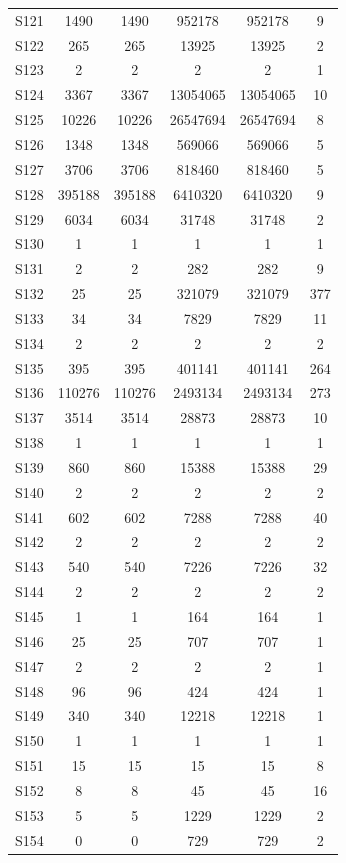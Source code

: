 {\begin{longtable}{l S[table-format=9.0] S[table-format=9.0] S[table-format=9.0] S[table-format=9.0] S[table-format=9.0]}
S121 & 1490 & 1490 & 952178 & 952178 & 9 \\
S122 & 265 & 265 & 13925 & 13925 & 2 \\
S123 & 2 & 2 & 2 & 2 & 1 \\
S124 & 3367 & 3367 & 13054065 & 13054065 & 10 \\
S125 & 10226 & 10226 & 26547694 & 26547694 & 8 \\
S126 & 1348 & 1348 & 569066 & 569066 & 5 \\
S127 & 3706 & 3706 & 818460 & 818460 & 5 \\
S128 & 395188 & 395188 & 6410320 & 6410320 & 9 \\
S129 & 6034 & 6034 & 31748 & 31748 & 2 \\
S130 & 1 & 1 & 1 & 1 & 1 \\
S131 & 2 & 2 & 282 & 282 & 9 \\
S132 & 25 & 25 & 321079 & 321079 & 377 \\
S133 & 34 & 34 & 7829 & 7829 & 11 \\
S134 & 2 & 2 & 2 & 2 & 2 \\
S135 & 395 & 395 & 401141 & 401141 & 264 \\
S136 & 110276 & 110276 & 2493134 & 2493134 & 273 \\
S137 & 3514 & 3514 & 28873 & 28873 & 10 \\
S138 & 1 & 1 & 1 & 1 & 1 \\
S139 & 860 & 860 & 15388 & 15388 & 29 \\
S140 & 2 & 2 & 2 & 2 & 2 \\
S141 & 602 & 602 & 7288 & 7288 & 40 \\
S142 & 2 & 2 & 2 & 2 & 2 \\
S143 & 540 & 540 & 7226 & 7226 & 32 \\
S144 & 2 & 2 & 2 & 2 & 2 \\
S145 & 1 & 1 & 164 & 164 & 1 \\
S146 & 25 & 25 & 707 & 707 & 1 \\
S147 & 2 & 2 & 2 & 2 & 1 \\
S148 & 96 & 96 & 424 & 424 & 1 \\
S149 & 340 & 340 & 12218 & 12218 & 1 \\
S150 & 1 & 1 & 1 & 1 & 1 \\
S151 & 15 & 15 & 15 & 15 & 8 \\
S152 & 8 & 8 & 45 & 45 & 16 \\
S153 & 5 & 5 & 1229 & 1229 & 2 \\
S154 & 0 & 0 & 729 & 729 & 2 \\

\end{longtable}}
